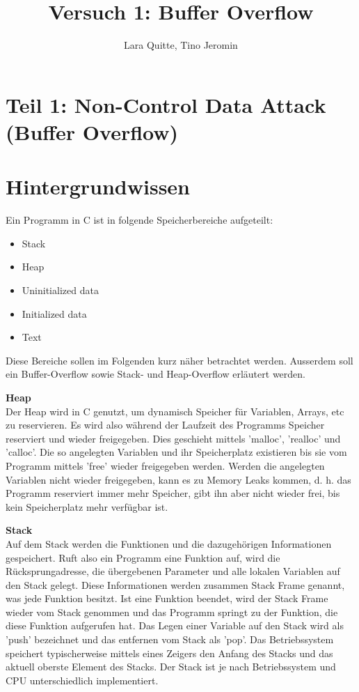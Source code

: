 \documentclass[12pt,a4paper]{article}
\date{}
\author{Lara Quitte, Tino Jeromin}
\title{Versuch 1: Buffer Overflow}
\begin{document}
	\maketitle
	
	\section*{Teil 1: Non-Control Data Attack (Buffer Overflow)}
		
	\section*{Hintergrundwissen}
	Ein Programm in C ist in folgende Speicherbereiche aufgeteilt:
	\begin{itemize}
		\item Stack
		\item Heap
		\item Uninitialized data
		\item Initialized data 
		\item Text
	\end{itemize}
	
	Diese Bereiche sollen im Folgenden kurz näher betrachtet werden. Ausserdem soll ein Buffer-Overflow sowie Stack- und Heap-Overflow erläutert werden.
	\bigskip
	
	\textbf{Heap} \\
	Der Heap wird in C genutzt, um dynamisch Speicher für Variablen, Arrays, etc zu reservieren.
	Es wird also während der Laufzeit des Programms Speicher reserviert und wieder freigegeben.
	Dies geschieht mittels 'malloc', 'realloc' und 'calloc'. 
	Die so angelegten Variablen und ihr Speicherplatz existieren bis sie vom Programm mittels 'free' wieder
	freigegeben werden. Werden die angelegten Variablen nicht wieder freigegeben, kann es zu Memory Leaks
	kommen, d. h. das Programm reserviert immer mehr Speicher, gibt ihn aber nicht wieder frei, bis kein 
	Speicherplatz mehr verfügbar ist.
	\bigskip
	
	\textbf{Stack} \\
	Auf dem Stack werden die Funktionen und die dazugehörigen Informationen gespeichert.
	Ruft also ein Programm eine Funktion auf, wird die Rücksprungadresse, die übergebenen Parameter und 
	alle lokalen Variablen auf den Stack gelegt. Diese Informationen werden zusammen Stack Frame genannt, 
	was jede Funktion besitzt.
	Ist eine Funktion beendet, wird der Stack Frame wieder vom Stack genommen und das Programm springt 
	zu der Funktion, die diese Funktion aufgerufen hat.
	Das Legen einer Variable auf den Stack wird als 'push' bezeichnet und das entfernen vom Stack als 'pop'.
	Das Betriebssystem speichert typischerweise mittels eines Zeigers den Anfang des Stacks und das aktuell 
	oberste Element des Stacks.
	Der Stack ist je nach Betriebssystem und CPU unterschiedlich implementiert.
	\bigskip
	
\end{document}
